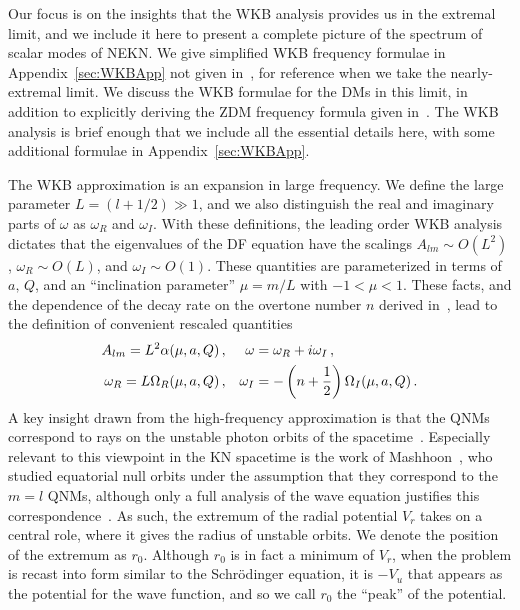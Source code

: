 \begin{refsection}
Our focus is on the insights that the WKB analysis provides us in the extremal limit, and we include it here to present a complete picture of the spectrum of scalar modes of NEKN.
We give simplified WKB frequency formulae in Appendix~\ref{sec:WKBApp} not given in~\cite{Zhao:2015pqa}, for reference when we take the nearly-extremal limit.
We discuss the WKB formulae for the DMs in this limit, in addition to explicitly deriving the ZDM frequency formula given in~\cite{HodEikonal2012}.
The WKB analysis is brief enough that we include all the essential details here, with some additional formulae in Appendix~\ref{sec:WKBApp}. 

The WKB approximation is an expansion in large frequency. We define the large parameter $L = (l+1/2) \gg 1$, and we also distinguish the real and imaginary parts of $\omega$ as $\omega_R$ and $\omega_I$. With these definitions, the leading order WKB analysis dictates that the eigenvalues of the DF equation have the scalings $A_{lm}\sim O(L^2)$, $\omega_R \sim O(L)$, and $\omega_I \sim O(1)$. These quantities are parameterized in terms of $a,\, Q$, and an ``inclination parameter'' $\mu = m/L$ with $-1 < \mu <1$. These facts, and the dependence of the decay rate on the overtone number $n$ derived in~\cite{Schutz:1985zz}, lead to the definition of convenient rescaled quantities
\begin{align}
A_{lm} = L^2 \alpha(\mu,a,Q)\,, & & \omega &= \omega_R + i \omega_I \,, \notag \\
\omega_R = L \Omega_R(\mu,a,Q)\,, & & \omega_I &= - \left(n + \frac 12\right)\Omega_I(\mu,a,Q) \,.
\end{align}
A key insight drawn from the high-frequency approximation is that the QNMs correspond to rays on the unstable photon orbits of the spacetime~\cite{Goebel1972,FerrariMashhoon1984,Cardoso2009,Dolan2010,Yang:2012he,HodEikonal2012,Zhao:2015pqa}. 
Especially relevant to this viewpoint in the KN spacetime is the work of Mashhoon~\cite{Mashhoon1985}, who studied equatorial null orbits under the assumption that they correspond to the $m=l$ QNMs, although only a full analysis of the wave equation justifies this correspondence~\cite{Yang:2012he,Zhao:2015pqa}. 
As such, the extremum of the radial potential $V_r$ takes on a central role, where it gives the radius of unstable orbits. 
We denote the position of the extremum as $r_0$. 
Although $r_0$ is in fact a minimum of $V_r$, when the problem is recast into form similar to the Schr\"{o}dinger equation, it is $-V_u$ that appears as the potential for the wave function, and so we call $r_0$ the ``peak'' of the potential.


\end{refsection}
